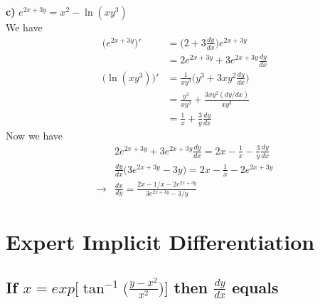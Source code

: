 \documentclass{article}
\begin{document}
\textbf{c)} $e^{2x+3y} = x^2 - \ln(xy^3)$ \\
We have
\begin{align*}
    \Big(e^{2x+3y}\Big)' &= \Big(2 + 3\frac{dy}{dx}\Big) e^{2x+3y} \\
                        &= 2e^{2x+3y} + 3e^{2x+3y}\frac{dy}{dx} \\
    \Big(\ln(xy^3)\Big)' &= \frac{1}{xy^3}\Big(y^3 + 3xy^2\frac{dy}{dx}\Big) \\
                        &= \frac{y^3}{xy^3} + \frac{3xy^2(dy/dx)}{xy^3} \\
                        &= \frac{1}{x} + \frac{3}{y}\frac{dy}{dx}
\end{align*}
Now we have
\begin{align*}
    &2e^{2x+3y} + 3e^{2x+3y}\frac{dy}{dx} = 2x - \frac{1}{x} - \frac{3}{y}\frac{dy}{dx} \\
    &\frac{dy}{dx}\Big(3e^{2x+3y} - 3y\Big) = 2x - \frac{1}{x} - 2e^{2x+3y} \\
    \rightarrow &\frac{dx}{dy} = \frac{2x - 1/x - 2e^{2x+3y}}{3e^{2x+3y} - 3/y}
\end{align*}


\section{Expert Implicit Differentiation}

\subsection{If $x = exp\Bigg[\tan^{-1}\Big(\frac{y-x^2}{x^2}\Big) \Bigg]$ then $\frac{dy}{dx}$ equals}
\end{document}
